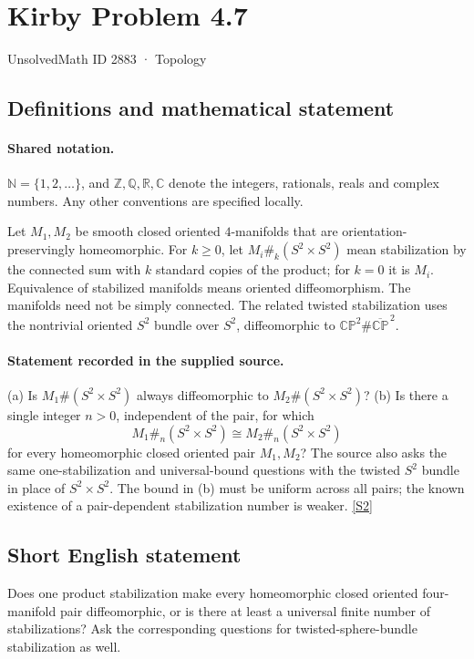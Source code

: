 \documentclass[11pt]{article}
\newcommand{\sref}[2]{\hyperlink{source:#1:#2}{[S#2]}}
\begin{document}
\setcounter{section}{2882}
\section{Kirby Problem 4.7}\label{2883}
{\small\sffamily UnsolvedMath ID 2883 · Topology}
\subsection{Definitions and mathematical statement}

\paragraph{Shared notation.}$\mathbb N=\{1,2,\ldots\}$, and $\mathbb Z,\mathbb Q,\mathbb R,\mathbb C$ denote the integers, rationals, reals and complex numbers. Any other conventions are specified locally.


Let $M_1,M_2$ be smooth closed oriented $4$-manifolds that are orientation-preservingly homeomorphic. For $k\ge0$, let $M_i\#_k(S^2\times S^2)$ mean stabilization by the connected sum with $k$ standard copies of the product; for $k=0$ it is $M_i$. Equivalence of stabilized manifolds means oriented diffeomorphism. The manifolds need not be simply connected. The related twisted stabilization uses the nontrivial oriented $S^2$ bundle over $S^2$, diffeomorphic to $\mathbb{CP}^2\#\overline{\mathbb{CP}}^{\,2}$.
\paragraph{Statement recorded in the supplied source.}
(a) Is $M_1\#(S^2\times S^2)$ always diffeomorphic to $M_2\#(S^2\times S^2)$? (b) Is there a single integer $n>0$, independent of the pair, for which
\[
M_1\#_n(S^2\times S^2)\cong M_2\#_n(S^2\times S^2)
\]
for every homeomorphic closed oriented pair $M_1,M_2$? The source also asks the same one-stabilization and universal-bound questions with the twisted $S^2$ bundle in place of $S^2\times S^2$. The bound in (b) must be uniform across all pairs; the known existence of a pair-dependent stabilization number is weaker. \sref{2883}{2}
\subsection{Short English statement}
Does one product stabilization make every homeomorphic closed oriented four-manifold pair diffeomorphic, or is there at least a universal finite number of stabilizations? Ask the corresponding questions for twisted-sphere-bundle stabilization as well.
\end{document}
